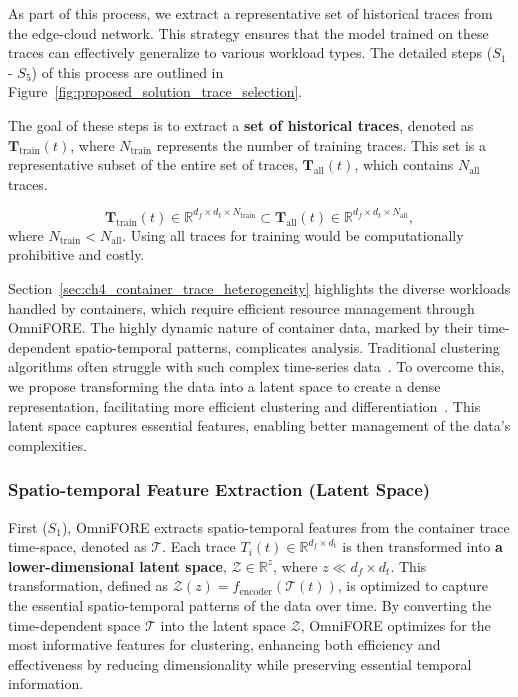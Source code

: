 As part of this process, we extract a representative set of historical traces from the edge-cloud network. This strategy ensures that the model trained on these traces can effectively generalize to various workload types. The detailed steps ($S_1$ - $S_5$) of this process are outlined in Figure~\ref{fig:proposed_solution_trace_selection}.

The goal of these steps is to extract a \textbf{set of historical traces}, denoted as \(\mathbf{T}_{\text{train}}(t)\), where \(N_{\text{train}}\) represents the number of training traces. This set is a representative subset of the entire set of traces, \(\mathbf{T}_{\text{all}}(t)\), which contains \(N_{\text{all}}\) traces.

\begin{equation}
\mathbf{T}_{\text{train}}(t) \in \mathbb{R}^{d_f \times d_t \times N_{\text{train}}} \subset \mathbf{T}_{\text{all}}(t) \in \mathbb{R}^{d_f \times d_t \times N_{\text{all}}},
\end{equation}
where $N_{\text{train}} < N_{\text{all}}$. Using all traces for training would be computationally prohibitive and costly.

Section~\ref{sec:ch4_container_trace_heterogeneity} highlights the diverse workloads handled by containers, which require efficient resource management through \ac{OmniFORE}. The highly dynamic nature of container data, marked by their time-dependent spatio-temporal patterns, complicates analysis. Traditional clustering algorithms often struggle with such complex time-series data~\cite{gupta2020approaches}. To overcome this, we propose transforming the data into a latent space to create a dense representation, facilitating more efficient clustering and differentiation~\cite{frazier2018tutorial}. This latent space captures essential features, enabling better management of the data's complexities.

\subsubsection{Spatio-temporal Feature Extraction (Latent Space)}

First ($S_1$), \ac{OmniFORE} extracts spatio-temporal features from the container trace time-space, denoted as $\mathcal{T}$. Each trace $T_i(t) \in \mathbb{R}^{d_f \times d_{\text{t}}}$ is then transformed into \textbf{a lower-dimensional latent space}, $\mathcal{Z} \in \mathbb{R}^{z}$, where $z \ll d_f \times d_t$. This transformation, defined as $\mathcal{Z}(z) = f_{\text{encoder}}(\mathcal{T}(t))$, is optimized to capture the essential spatio-temporal patterns of the data over time. By converting the time-dependent space $\mathcal{T}$ into the latent space $\mathcal{Z}$, \ac{OmniFORE} optimizes for the most informative features for clustering, enhancing both efficiency and effectiveness by reducing dimensionality while preserving essential temporal information.

